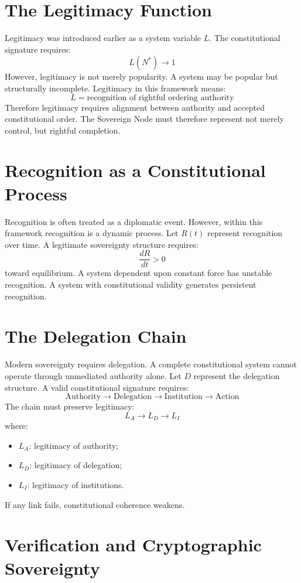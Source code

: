 \documentclass[11pt,openany]{book}
\theoremstyle{plain}
\theoremstyle{definition}
\begin{document}
\section{The Legitimacy Function}

Legitimacy was introduced earlier as a system variable \(L\). The constitutional signature requires:
\[
L(N^*) \to 1
\]
However, legitimacy is not merely popularity. A system may be popular but structurally incomplete. Legitimacy in this framework means:
\[
L = \text{recognition of rightful ordering authority}
\]
Therefore legitimacy requires alignment between authority and accepted constitutional order. The Sovereign Node must therefore represent not merely control, but rightful completion.

\section{Recognition as a Constitutional Process}

Recognition is often treated as a diplomatic event. However, within this framework recognition is a dynamic process. Let \(R(t)\) represent recognition over time. A legitimate sovereignty structure requires:
\[
\frac{dR}{dt} > 0
\]
toward equilibrium. A system dependent upon constant force has unstable recognition. A system with constitutional validity generates persistent recognition.

\section{The Delegation Chain}

Modern sovereignty requires delegation. A complete constitutional system cannot operate through unmediated authority alone. Let \(D\) represent the delegation structure. A valid constitutional signature requires:
\[
\text{Authority} \longrightarrow \text{Delegation} \longrightarrow \text{Institution} \longrightarrow \text{Action}
\]
The chain must preserve legitimacy:
\[
L_A \longrightarrow L_D \longrightarrow L_I
\]
where:
\begin{itemize}
\item \(L_A\): legitimacy of authority;
\item \(L_D\): legitimacy of delegation;
\item \(L_I\): legitimacy of institutions.
\end{itemize}
If any link fails, constitutional coherence weakens.

\section{Verification and Cryptographic Sovereignty}
\end{document}
